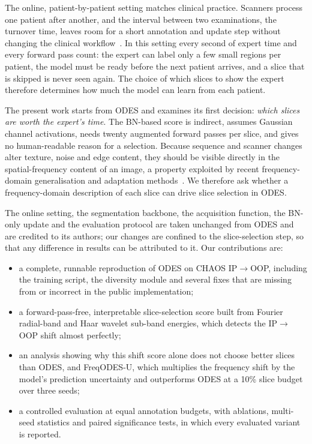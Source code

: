 \documentclass[a4paper,fleqn]{cas-dc}
\begin{document}
The online, patient-by-patient setting matches clinical practice. Scanners process one patient after another, and the interval between two examinations, the turnover time, leaves room for a short annotation and update step without changing the clinical workflow~\cite{islam2025odes}. In this setting every second of expert time and every forward pass count: the expert can label only a few small regions per patient, the model must be ready before the next patient arrives, and a slice that is skipped is never seen again. The choice of which slices to show the expert therefore determines how much the model can learn from each patient.

The present work starts from ODES and examines its first decision: \emph{which slices are worth the expert's time}. The BN-based score is indirect, assumes Gaussian channel activations, needs twenty augmented forward passes per slice, and gives no human-readable reason for a selection. Because sequence and scanner changes alter texture, noise and edge content, they should be visible directly in the spatial-frequency content of an image, a property exploited by recent frequency-domain generalisation and adaptation methods~\cite{zhao2024morestyle,wu2025randdg,yin2025ddfp,pan2025wgsf}. We therefore ask whether a frequency-domain description of each slice can drive slice selection in ODES.

The online setting, the segmentation backbone, the acquisition function, the BN-only update and the evaluation protocol are taken unchanged from ODES and are credited to its authors; our changes are confined to the slice-selection step, so that any difference in results can be attributed to it. Our contributions are:
\begin{itemize}
  \item a complete, runnable reproduction of ODES on CHAOS IP$\rightarrow$OOP, including the training script, the diversity module and several fixes that are missing from or incorrect in the public implementation;
  \item a forward-pass-free, interpretable slice-selection score built from Fourier radial-band and Haar wavelet sub-band energies, which detects the IP$\rightarrow$OOP shift almost perfectly;
  \item an analysis showing why this shift score alone does not choose better slices than ODES, and FreqODES-U, which multiplies the frequency shift by the model's prediction uncertainty and outperforms ODES at a 10\% slice budget over three seeds;
  \item a controlled evaluation at equal annotation budgets, with ablations, multi-seed statistics and paired significance tests, in which every evaluated variant is reported.
\end{itemize}
\end{document}

